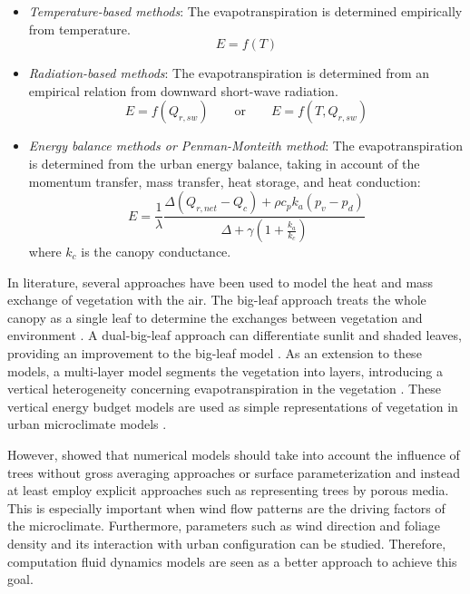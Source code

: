 \begin{itemize}
	\item \textit{Temperature-based methods}: The evapotranspiration is determined empirically from temperature.
		\begin{equation}
		E = f(T)
		\end{equation}
	\item \textit{Radiation-based methods}: The evapotranspiration is determined from an empirical relation from downward short-wave radiation.
		\begin{equation}
			E = f(Q_{r,sw}) \qquad \mathrm{or} \qquad E = f(T,Q_{r,sw})
		\end{equation}
	\item \textit{Energy balance methods or Penman-Monteith method}: The evapotranspiration is determined from the urban energy balance, taking in account of the momentum transfer, mass transfer, heat storage, and heat conduction:
		\begin{equation}
			E = \frac{1}{\lambda} \frac{\Delta \left(Q_{r,net}-Q_c\right) + \rho c_p k_a \left(p_v - p_d\right)}{\Delta + \gamma \left(1 + \frac{k_a}{k_c}\right) }
		\end{equation}
	where $k_c$ is the canopy conductance.
\end{itemize}

In literature, several approaches have been used to model the heat and mass exchange of vegetation with the air. The big-leaf approach treats the whole canopy as a single leaf to determine the exchanges between vegetation and environment \citep{2861,Shuttleworth1985,Sellers1996}. A dual-big-leaf approach can differentiate sunlit and shaded leaves, providing an improvement to the big-leaf model \citep{Dai2004}. As an extension to these models, a multi-layer model segments the vegetation into layers, introducing a vertical heterogeneity concerning evapotranspiration in the vegetation \cite{Wang1990,Leuning1998}. These vertical energy budget models are used as simple representations of vegetation in urban microclimate models \citep{Dolman1993,Krayenhoff2014,Ryder2014}. 

However, \cite{HefnySalim2015} showed that numerical models should take into account the influence of trees without gross averaging approaches or surface parameterization and instead at least employ explicit approaches such as representing trees by porous media. This is especially important when wind flow patterns are the driving factors of the microclimate. Furthermore, parameters such as wind direction and foliage density and its interaction with urban configuration can be studied. Therefore, computation fluid dynamics models are seen as a better approach to achieve this goal. 

